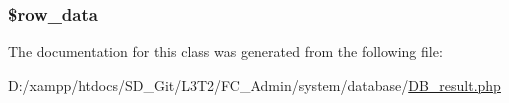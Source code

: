 \subsubsection[{\$row\+\_\+data}]{\setlength{\rightskip}{0pt plus 5cm}\$row\+\_\+data}\label{class_c_i___d_b__result_a335b4c27a1529df9e484e044e470ec07}


The documentation for this class was generated from the following file\+:\begin{DoxyCompactItemize}
\item 
D\+:/xampp/htdocs/\+S\+D\+\_\+\+Git/\+L3\+T2/\+F\+C\+\_\+\+Admin/system/database/\hyperlink{_d_b__result_8php}{D\+B\+\_\+result.\+php}\end{DoxyCompactItemize}
